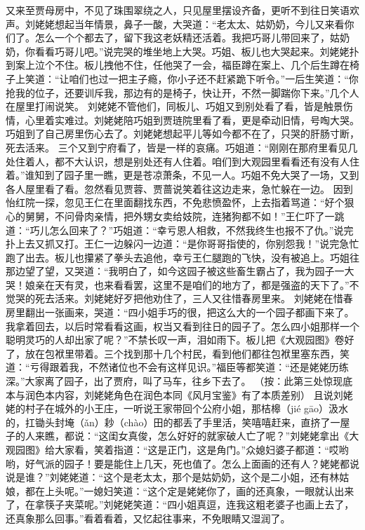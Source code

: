 \documentclass[12pt,oneside]{book}
\begin{document}
又来至贾母房中，不见了珠围翠绕之人，只见屋里摆设齐备，更听不到往日笑语欢声。刘姥姥想起当年情景，鼻子一酸，大哭道：“老太太、姑奶奶，今儿又来看你们了。怎么一个个都去了，留下我这老妖精还活着。我把巧哥儿带回来了，姑奶奶，你看看巧哥儿吧。”说完哭的堆坐地上大哭。巧姐、板儿也大哭起来。刘姥姥扑到案上泣个不住。板儿拽他不住，任他哭了一会，福臣蹲在案上、几个后生蹲在椅子上笑道：“让咱们也过一把主子瘾，你小子还不赶紧跪下听令。”一后生笑道：“你抢我的位子，还要训斥我，那边有的是椅子，快让开，不然一脚踹你下来。”几个人在屋里打闹说笑。
刘姥姥不管他们，同板儿、巧姐又到别处看了看，皆是触景伤情，心里着实难过。刘姥姥陪巧姐到贾琏院里看了看，更是牵动旧情，号啕大哭。巧姐到了自己房里伤心去了。刘姥姥想起平儿等如今都不在了，只哭的肝肠寸断，死去活来。
三个又到宁府看了，皆是一样的哀痛。巧姐道：“刚刚在那府里看见几处住着人，都不大认识，想是别处还有人住着。咱们到大观园里看看还有没有人住着。”谁知到了园子里一瞧，更是苍凉萧条，不见一人。巧姐不免大哭了一场，又到各人屋里看了看。忽然看见贾蓉、贾蔷说笑着往这边走来，急忙躲在一边。
因到怡红院一探，忽见王仁在里面翻找东西，不免悲愤盈怀，上去指着骂道：“好个狠心的舅舅，不问骨肉亲情，把外甥女卖给妓院，连猪狗都不如！”王仁吓了一跳道：“巧儿怎么回来了？”巧姐道：“幸亏恩人相救，不然我终生也报不了仇。”说完扑上去又抓又打。王仁一边躲闪一边道：“是你哥哥指使的，你别怨我！”说完急忙跑了出去。板儿也攥紧了拳头去追他，幸亏王仁腿跑的飞快，没有被追上。巧姐往那边望了望，又哭道：“我明白了，如今这园子被这些畜生霸占了，我为园子一大哭！娘亲在天有灵，也来看看罢，这里不是咱们的地方了，都是强盗的天下了。”不觉哭的死去活来。刘姥姥好歹把他劝住了，三人又往惜春房里来。
刘姥姥在惜春房里翻出一张画来，哭道：“四小姐手巧的很，把这么大的一个园子都画下来了。我拿着回去，以后时常看看这画，权当又看到往日的园子了。怎么四小姐那样一个聪明灵巧的人却出家了呢？”不禁长叹一声，泪如雨下。板儿把《大观园图》卷好了，放在包袱里带着。三个找到那十几个村民，看到他们都往包袱里塞东西，笑道：“亏得跟着我，不然诸位也不会有这样见识。”福臣等都笑道：“还是姥姥历练深。”大家离了园子，出了贾府，叫了马车，往乡下去了。
（按：此第三处惊现底本与润色本内容，刘姥姥角色在润色本同《风月宝鉴》有了本质差别）
且说刘姥姥的村子在城外的小王庄，一听说王家带回个公府小姐，那桔槔（jié gāo）汲水的，扛锄头封埯（ǎn）耖（chào）田的都丢了手里活，笑嘻嘻赶来，直挤了一屋子的人来瞧，都说：“这闺女真俊，怎么好好的就家破人亡了呢？”刘姥姥拿出《大观园图》给大家看，笑着指道：“这是正门，这是角门。”众媳妇婆子都道：“哎哟哟，好气派的园子！要是能住上几天，死也值了。怎么上面画的还有人？姥姥都说说是谁？”刘姥姥道：“这个是老太太，那个是姑奶奶，这个是二小姐，还有林姑娘，都在上头呢。”一媳妇笑道：“这个定是姥姥你了，画的还真象，一眼就认出来了，在拿筷子夹菜呢。”刘姥姥笑道：“四小姐真逗，连我这粗老婆子也画上去了，还真象那么回事。”看着看着，又忆起往事来，不免眼睛又湿润了。
\end{document}
